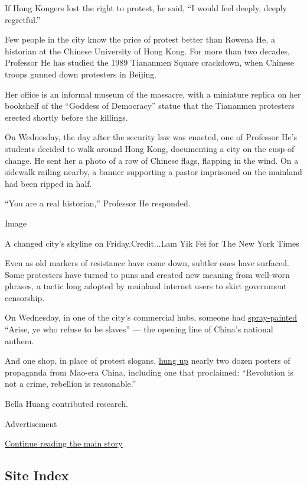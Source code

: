 If Hong Kongers lost the right to protest, he said, ``I would feel
deeply, deeply regretful.''

Few people in the city know the price of protest better than Rowena He,
a historian at the Chinese University of Hong Kong. For more than two
decades, Professor He has studied the 1989 Tiananmen Square crackdown,
when Chinese troops gunned down protesters in Beijing.

Her office is an informal museum of the massacre, with a miniature
replica on her bookshelf of the ``Goddess of Democracy'' statue that the
Tiananmen protesters erected shortly before the killings.

On Wednesday, the day after the security law was enacted, one of
Professor He's students decided to walk around Hong Kong, documenting a
city on the cusp of change. He sent her a photo of a row of Chinese
flags, flapping in the wind. On a sidewalk railing nearby, a banner
supporting a pastor imprisoned on the mainland had been ripped in half.

``You are a real historian,'' Professor He responded.

Image

A changed city's skyline on Friday.Credit...Lam Yik Fei for The New York
Times

Even as old markers of resistance have come down, subtler ones have
surfaced. Some protesters have turned to puns and created new meaning
from well-worn phrases, a tactic long adopted by mainland internet users
to skirt government censorship.

On Wednesday, in one of the city's commercial hubs, someone had
\href{https://twitter.com/USPhongkong/status/1278281464140820485}{spray-painted}
``Arise, ye who refuse to be slaves'' --- the opening line of China's
national anthem.

And one shop, in place of protest slogans,
\href{https://twitter.com/krislc/status/1278729190628458498/photo/1}{hung
up} nearly two dozen posters of propaganda from Mao-era China, including
one that proclaimed: ``Revolution is not a crime, rebellion is
reasonable.''

Bella Huang contributed research.

Advertisement

\protect\hyperlink{after-bottom}{Continue reading the main story}

\hypertarget{site-index}{%
\subsection{Site Index}\label{site-index}}


